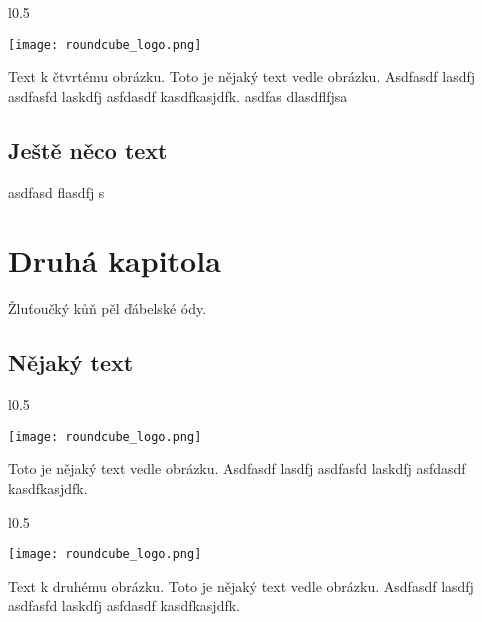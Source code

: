\documentclass[12pt,a4paper,twoside]{book}
\begin{document}
\begin{wrapfigure}{l}{0.5\textwidth}
  \vspace{-20pt}
  \begin{center}
    \texttt{[image: roundcube\_logo.png]}
  \end{center}
  \vspace{-20pt}
\end{wrapfigure}

Text k čtvrtému obrázku. Toto je nějaký text vedle obrázku. Asdfasdf lasdfj asdfasfd laskdfj asfdasdf kasdfkasjdfk.
\newline
asdfas dlasdflfjsa 
\section{Ještě něco text}
asdfasd flasdfj s
\chapter{Druhá kapitola}
Žluťoučký kůň pěl ďábelské ódy.
\section{Nějaký text}

\begin{wrapfigure}{l}{0.5\textwidth}
  \vspace{-30pt}
  \begin{center}
    \texttt{[image: roundcube\_logo.png]}
  \end{center}
  \vspace{-10pt}
\end{wrapfigure}

Toto je nějaký text vedle obrázku. Asdfasdf lasdfj asdfasfd laskdfj asfdasdf kasdfkasjdfk.
\newline

\begin{wrapfigure}{l}{0.5\textwidth}
  \vspace{-20pt}
  \begin{center}
    \texttt{[image: roundcube\_logo.png]}
  \end{center}
  \vspace{-20pt}
\end{wrapfigure}

Text k druhému obrázku. Toto je nějaký text vedle obrázku. Asdfasdf lasdfj asdfasfd laskdfj asfdasdf kasdfkasjdfk.
\newline
\end{document}
